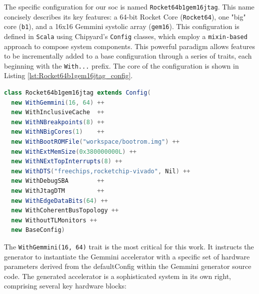 The specific configuration for our \acrshort{soc} is named \texttt{Rocket64b1gem16jtag}. This name concisely describes its key features: a 64-bit Rocket Core (\texttt{Rocket64}), one "big" core (\texttt{b1}), and a 16x16 Gemmini systolic array (\texttt{gem16}). This configuration is defined in \texttt{Scala} using Chipyard's \texttt{Config} classes, which employ a \texttt{mixin-based} approach to compose system components. This powerful paradigm allows features to be incrementally added to a base configuration through a series of traits, each beginning with the \texttt{With...} prefix. The core of the configuration is shown in Listing \ref{lst:Rocket64b1gem16jtag_config}.

\begin{lstlisting}[language=scala, caption={The \texttt{Rocket64b1gem16jtag} configuration class.}, label=lst:Rocket64b1gem16jtag_config]
class Rocket64b1gem16jtag extends Config(
  new WithGemmini(16, 64) ++
  new WithInclusiveCache  ++
  new WithNBreakpoints(8) ++
  new WithNBigCores(1)    ++
  new WithBootROMFile("workspace/bootrom.img") ++
  new WithExtMemSize(0x380000000L) ++
  new WithNExtTopInterrupts(8) ++
  new WithDTS("freechips,rocketchip-vivado", Nil) ++
  new WithDebugSBA        ++
  new WithJtagDTM         ++
  new WithEdgeDataBits(64) ++
  new WithCoherentBusTopology ++
  new WithoutTLMonitors ++
  new BaseConfig)
\end{lstlisting}

The \texttt{WithGemmini(16, 64)} trait is the most critical for this work. It instructs the generator to instantiate the Gemmini accelerator with a specific set of hardware parameters derived from the defaultConfig within the Gemmini generator source code. The generated accelerator is a sophisticated system in its own right, comprising several key hardware blocks:

